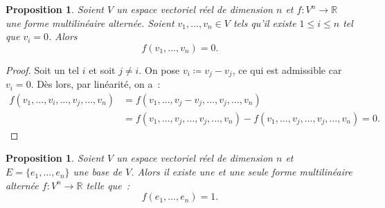 \documentclass{article}
\newcommand{\R}{\mathbb R}
\newtheorem{prp}[thm]{Proposition}
\theoremstyle{definition}
\theoremstyle{remark}
\begin{document}
		\begin{prp}\label{f(0,)=0} Soient $V$ un espace vectoriel réel de dimension $n$ et $f : V^n \to \R$ une forme multilinéaire alternée. Soient
		$v_1, \dotsc, v_n \in V$ tels qu'il existe $1 \leq i \leq n$ tel que $v_i = 0$. Alors \[f(v_1, \dotsc, v_n) = 0.\] \end{prp}

		\begin{proof} Soit un tel $i$ et soit $j \neq i$. On pose $v_i \coloneqq v_j - v_j$, ce qui est admissible car $v_i = 0$. Dès lors, par linéarité, on a~:
		\[\begin{aligned}
			f(v_1, \dotsc, v_i, \dotsc, v_j, \dotsc, v_n) &= f(v_1, \dotsc, v_j-v_j, \dotsc, v_j, \dotsc, v_n) \\
				&= f(v_1, \dotsc, v_j, \dotsc, v_j, \dotsc, v_n) - f(v_1, \dotsc, v_j, \dotsc, v_j, \dotsc, v_n) = 0.
		\end{aligned}\]
		\end{proof}

		\begin{prp} Soient $V$ un espace vectoriel réel de dimension $n$ et $E = \{e_1, \dotsc, e_n\}$ une base de $V$. Alors il existe une et une seule forme
		multilinéaire alternée $f : V^n \to \R$ telle que~:
		\[f(e_1, \dotsc, e_n) = 1.\] \end{prp}
\end{document}
